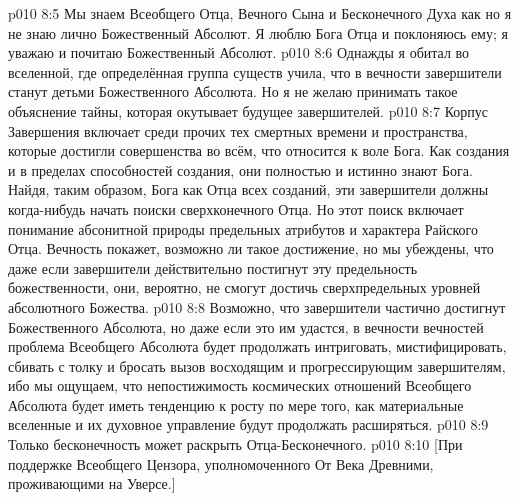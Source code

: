 \vs p010 8:5 Мы знаем Всеобщего Отца, Вечного Сына и Бесконечного Духа как  но я не знаю лично Божественный Абсолют. Я люблю Бога Отца и поклоняюсь ему; я уважаю и почитаю Божественный Абсолют.
\vs p010 8:6 \pc Однажды я обитал во вселенной, где определённая группа существ учила, что в вечности завершители станут детьми Божественного Абсолюта. Но я не желаю принимать такое объяснение тайны, которая окутывает будущее завершителей.
\vs p010 8:7 Корпус Завершения включает среди прочих тех смертных времени и пространства, которые достигли совершенства во всём, что относится к воле Бога. Как создания и в пределах способностей создания, они полностью и истинно знают Бога. Найдя, таким образом, Бога как Отца всех созданий, эти завершители должны когда\hyp{}нибудь начать поиски сверхконечного Отца. Но этот поиск включает понимание абсонитной природы предельных атрибутов и характера Райского Отца. Вечность покажет, возможно ли такое достижение, но мы убеждены, что даже если завершители действительно постигнут эту предельность божественности, они, вероятно, не смогут достичь сверхпредельных уровней абсолютного Божества.
\vs p010 8:8 Возможно, что завершители частично достигнут Божественного Абсолюта, но даже если это им удастся, в вечности вечностей проблема Всеобщего Абсолюта будет продолжать интриговать, мистифицировать, сбивать с толку и бросать вызов восходящим и прогрессирующим завершителям, ибо мы ощущаем, что непостижимость космических отношений Всеобщего Абсолюта будет иметь тенденцию к росту по мере того, как материальные вселенные и их духовное управление будут продолжать расширяться.
\vs p010 8:9 \pc Только бесконечность может раскрыть Отца\hyp{}Бесконечного.
\vsetoff
\vs p010 8:10 [При поддержке Всеобщего Цензора, уполномоченного От Века Древними, проживающими на Уверсе.]
\quizlink
